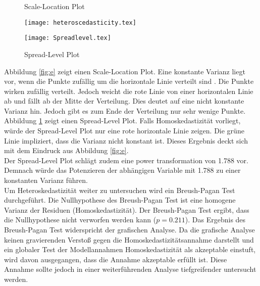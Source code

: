 \documentclass[11pt,a4paper]{article}
\begin{document}
\begin{figure}
    \centering
    \begin{minipage}{0.45\textwidth}
\caption{Scale-Location Plot}\label{fig:e}
        \texttt{[image: heteroscedasticity.tex]} %
        
    \end{minipage}\hfill
    \begin{minipage}{0.45\textwidth}
\caption{Spread-Level Plot}\label{fig:f}
        \texttt{[image: Spreadlevel.tex]} %
        
    \end{minipage}
\end{figure}


Abbildung \ref{fig:e} zeigt einen Scale-Location Plot. Eine konstante Varianz liegt vor, wenn die Punkte zufällig um die horizontale Linie verteilt sind \parencite{kabacoff2015r}. Die Punkte wirken zufällig verteilt. Jedoch weicht die rote Linie von einer horizontalen Linie ab und fällt ab der Mitte der Verteilung. Dies deutet auf eine nicht konstante Varianz hin. Jedoch gibt es zum Ende der Verteilung nur sehr wenige Punkte.\\

Abbildung \ref{fig:f} zeigt einen Spread-Level Plot. Falls Ho­mo­s­ke­das­ti­zi­tät vorliegt, würde der Spread-Level Plot nur eine rote horizontale Linie zeigen. Die grüne Linie impliziert, dass die Varianz nicht konstant ist. Dieses Ergebnis deckt sich mit dem Eindruck aus Abbildung \ref{fig:e}.\\  
Der Spread-Level Plot schlägt zudem eine power transformation von 1.788 vor. Demnach würde das Potenzieren der abhängigen Variable mit 1.788 zu einer konstanten Varianz führen.\\ 

Um He­te­ro­s­ke­das­ti­zi­tät weiter zu untersuchen wird ein Breush-Pagan Test durchgeführt. Die Nullhypothese des Breush-Pagan Test ist eine homogene Varianz der Residuen (Ho­mo­s­ke­das­ti­zi­tät). Der Breush-Pagan Test ergibt, dass die Nullhypothese nicht verworfen werden kann ($p = 0.211$).
Das Ergebnis des Breush-Pagan Test widerspricht der grafischen Analyse. Da die grafische Analyse keinen gravierenden Verstoß gegen die Ho­mo­s­ke­das­ti­zi­tätsannahme darstellt und ein globaler Test der Modellannahmen Ho­mo­s­ke­das­ti­zi­tät als akzeptable einstuft, wird davon ausgegangen, dass die Annahme akzeptable erfüllt ist. Diese Annahme sollte jedoch in einer weiterführenden Analyse tiefgreifender untersucht werden.  
\end{document}
